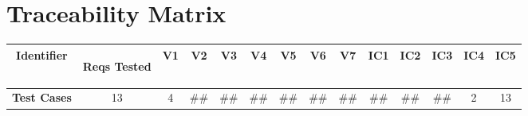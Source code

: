 \documentclass [10pt]{article}
\begin{document}
\section{Traceability Matrix}
\pagebreak
\begin{center}

\begin{tabularx} {\textwidth} {|c|c|c|c|c|c|c|c|c|c|c|c|c| c|} \hline
  \textbf{Identifier} & \begin{minipage} {.075\columnwidth} \vspace{1mm} \begin {center}\textbf{Reqs Tested}\vspace{1mm}\end{center}\end{minipage}
 & \textbf{V1} &\textbf{V2} &\textbf{V3} &\textbf{V4} &\textbf{V5} &\textbf{V6}&\textbf{V7} &\textbf{IC1} &\textbf{IC2} &\textbf{IC3} &\textbf{IC4}&\textbf{IC5}  \\ \hline
 
 
 \textbf{Test Cases}& 13 & 4  &\#\# &\#\# &\#\# &\#\# &\#\# &\#\# &\#\# &\#\# &\#\# & 2 & 13 \\ \hline


\end{tabularx}
\end{center}
\end{document}
